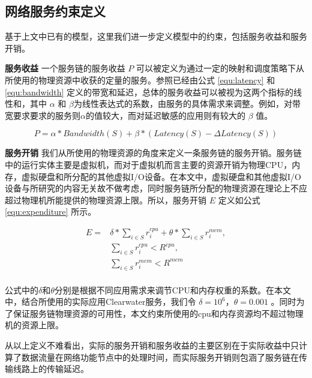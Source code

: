 \subsection{网络服务约束定义}
基于上文中已有的模型，这里我们进一步定义模型中的约束，包括服务收益和服务开销。

\textbf{服务收益}{ }一个服务链的服务收益 $P$ 可以被定义为通过一定的映射和调度策略下从所使用的物理资源中收获的定量的服务。参照已经由公式 \ref{equ:latency} 和 \ref{equ:bandwidth} 定义的带宽和延迟，总体的服务收益可以被视为这两个指标的线性和，其中 $\alpha$ 和 $\beta$为线性表达式的系数，由服务的具体需求来调整。例如，对带宽要求要求的服务则$\alpha$的值较大，而对延迟敏感的应用则有较大的 $\beta$ 值。

\begin{equation}                                                             
\label{equ:profit}
P = \alpha*Bandwidth(S) + \beta*(Latency(S)-\Delta Latency(S))
\end{equation}

\textbf{服务开销}{ }我们从所使用的物理资源的角度来定义一条服务链的服务开销。服务链中的运行实体主要是虚拟机，而对于虚拟机而言主要的资源开销为物理CPU，内存，虚拟硬盘和所分配的其他虚拟I/O设备。在本文中，虚拟硬盘和其他虚拟I/O设备与所研究的内容无关故不做考虑，同时服务链所分配的物理资源在理论上不应超过物理机所能提供的物理资源上限。所以，服务开销 $E$ 定义如公式 \ref{equ:expenditure} 所示。

\begin{equation}
\label{equ:expenditure}
\begin{aligned}
E = &\delta * \sum_{i\in S}{r^{cpu}_{i}} + \theta *\sum_{i\in S}{r^{mem}_i}, \\
&\sum_{i\in S}{r^{cpu}_{i}} < R^{cpu},\\
&\sum_{i\in S}{r^{mem}_i} < R^{mem}\\
\end{aligned}
\end{equation}

公式中的$\delta$和$\theta$分别是根据不同应用需求来调节CPU和内存权重的系数。在本文中，结合所使用的实际应用Clearwater服务，我们令 $\delta = 10^{6}$，$\theta = 0.001$ 。同时为了保证服务链物理资源的可用性，本文约束所使用的cpu和内存资源均不超过物理机的资源上限。

从以上定义不难看出，实际的服务开销和服务收益的主要区别在于实际收益中只计算了数据流量在网络功能节点中的处理时间，而实际服务开销则包涵了服务链在传输线路上的传输延迟。


